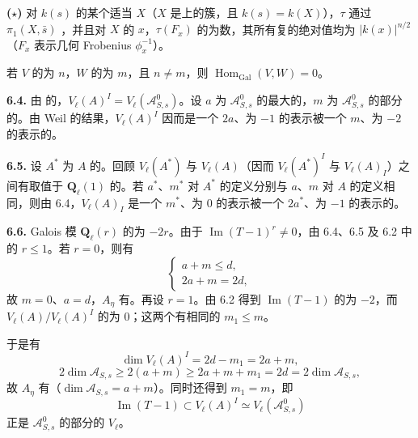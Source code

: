 \textbf{($\star$)} 对 $k(s)$ 的某个适当 $X$（$X$ 是上的簇，且 $k(s)=k(X)$），$\tau$ 通过 $\pi_1(X,\bar s)$ ，并且对 $X$ 的 $x$，$\tau(F_x)$ 的为数，其所有复的绝对值均为 $|k(x)|^{n/2}$（$F_x$ 表示几何 Frobenius $\phi_x^{-1}$）。

若 $V$ 的为 $n$，$W$ 的为 $m$，且 $n\ne m$，则 $\operatorname{Hom}_{\mathrm{Gal}}(V,W)=0$。

\textbf{6.4.} 由 的，$V_\ell(A)^I=V_\ell(\mathcal A^0_{S,s})$。设 $a$ 为 $\mathcal A^0_{S,s}$ 的最大的，$m$ 为 $\mathcal A^0_{S,s}$ 的部分的。由 Weil 的结果，$V_\ell(A)^I$ 因而是一个 $2a$、为 $-1$ 的表示被一个 $m$、为 $-2$ 的表示的。

\textbf{6.5.} 设 $A^*$ 为 $A$ 的。回顾 $V_\ell(A^*)$ 与 $V_\ell(A)$（因而 $V_\ell(A^*)^I$ 与 $V_\ell(A)_I$）之间有取值于 $\mathbf Q_\ell(1)$ 的。若 $a^*$、$m^*$ 对 $A^*$ 的定义分别与 $a$、$m$ 对 $A$ 的定义相同，则由 6.4，$V_\ell(A)_I$ 是一个 $m^*$、为 $0$ 的表示被一个 $2a^*$、为 $-1$ 的表示的。

\textbf{6.6.} Galois 模 $\mathbf Q_\ell(r)$ 的为 $-2r$。由于 $\operatorname{Im}(T-1)^r\ne0$，由 6.4、6.5 及 6.2 中的 $r\le1$。若 $r=0$，则有
\[
\begin{cases}a+m\le d,\\2a+m=2d,\end{cases}
\]
故 $m=0$、$a=d$，$A_\eta$ 有。再设 $r=1$。由 6.2 得到 $\operatorname{Im}(T-1)$ 的为 $-2$，而 $V_\ell(A)/V_\ell(A)^I$ 的为 $0$；这两个有相同的 $m_1\le m$。

于是有
\[
\dim V_\ell(A)^I=2d-m_1=2a+m,
\]
\[
2\dim\mathcal A_{S,s}\ge2(a+m)\ge2a+m+m_1=2d=2\dim\mathcal A_{S,s},
\]
故 $A_\eta$ 有（$\dim\mathcal A_{S,s}=a+m$）。同时还得到 $m_1=m$，即
\[
\operatorname{Im}(T-1)\subset V_\ell(A)^I\simeq V_\ell(\mathcal A^0_{S,s})
\]
正是 $\mathcal A^0_{S,s}$ 的部分的 $V_\ell$。

